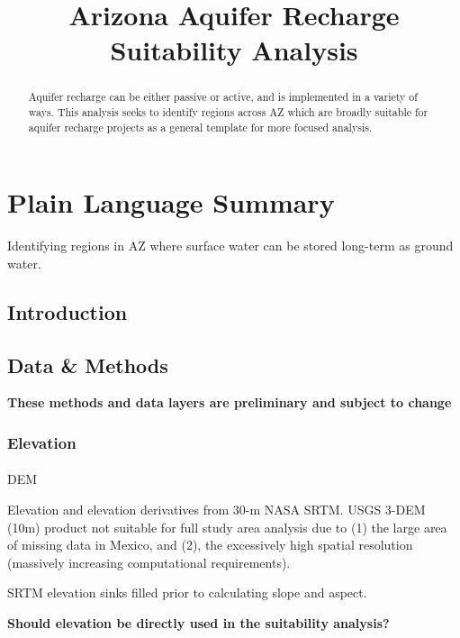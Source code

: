 \documentclass[
]{agujournal2019}
\makeatletter
\let\oldparagraph\paragraph
\renewcommand{\paragraph}{
    \@ifstar
      \xxxParagraphStar
      \xxxParagraphNoStar
  }
\newcommand{\xxxParagraphStar}[1]{\oldparagraph*{#1}\mbox{}}
\newcommand{\xxxParagraphNoStar}[1]{\oldparagraph{#1}\mbox{}}
\makeatother
\begin{document}
\title{Arizona Aquifer Recharge Suitability Analysis}



\begin{abstract}
Aquifer recharge can be either passive or active, and is implemented in
a variety of ways. This analysis seeks to identify regions across AZ
which are broadly suitable for aquifer recharge projects as a general
template for more focused analysis.
\end{abstract}

\section*{Plain Language Summary}
Identifying regions in AZ where surface water can be stored long-term as
ground water.




\subsection{Introduction}\label{introduction}

\subsection{Data \& Methods}\label{sec-data-methods}

\textbf{These methods and data layers are preliminary and subject to
change}

\subsubsection{Elevation}\label{elevation}

\paragraph{DEM}\label{dem}

Elevation and elevation derivatives from 30-m NASA SRTM. USGS 3-DEM
(10m) product not suitable for full study area analysis due to (1) the
large area of missing data in Mexico, and (2), the excessively high
spatial resolution (massively increasing computational requirements).

SRTM elevation sinks filled prior to calculating slope and aspect.

\textbf{Should elevation be directly used in the suitability analysis?}
\end{document}
